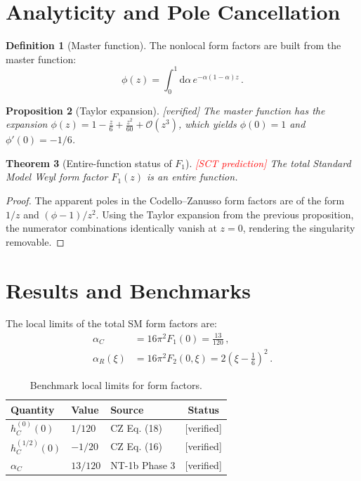 \documentclass[11pt,a4paper]{article}
\newtheorem{theorem}{Theorem}[section]
\newtheorem{proposition}[theorem]{Proposition}
\theoremstyle{definition}
\newtheorem{definition}[theorem]{Definition}
\theoremstyle{remark}
\newcommand{\verified}{\textcolor{green!60!black}{[verified] }}
\newcommand{\sctpred}{\textcolor{red}{[SCT prediction] }}
\begin{document}
\section{Analyticity and Pole Cancellation}

\begin{definition}[Master function]
The nonlocal form factors are built from the master function:
\begin{equation}
    \phi(z) = \int_0^1 \mathrm{d}\alpha\, e^{-\alpha(1-\alpha)z}\,.
\end{equation}
\end{definition}

\begin{proposition}[Taylor expansion]
\verified The master function has the expansion $\phi(z) = 1 - \frac{z}{6} + \frac{z^2}{60} + \mathcal{O}(z^3)$, which yields $\phi(0)=1$ and $\phi'(0)=-1/6$.
\end{proposition}

\begin{theorem}[Entire-function status of $F_1$]
\sctpred The total Standard Model Weyl form factor $F_1(z)$ is an entire function.
\end{theorem}

\begin{proof}
The apparent poles in the Codello--Zanusso form factors are of the form $1/z$ and $(\phi-1)/z^2$. Using the Taylor expansion from the previous proposition, the numerator combinations identically vanish at $z=0$, rendering the singularity removable. 
\end{proof}

\section{Results and Benchmarks}

\begin{tcolorbox}[colback=blue!5!white,colframe=blue!75!black,title=\textbf{Key Result: SM Local Limits}]
The local limits of the total SM form factors are:
\begin{align}
    \alpha_C &= 16\pi^2 F_1(0) = \frac{13}{120}\,, \\
    \alpha_R(\xi) &= 16\pi^2 F_2(0, \xi) = 2\left(\xi - \frac{1}{6}\right)^2\,.
\end{align}
\end{tcolorbox}

\begin{table}[h]
\centering
\begin{tabular}{lllc}
\toprule
\textbf{Quantity} & \textbf{Value} & \textbf{Source} & \textbf{Status} \\
\midrule
$h_C^{(0)}(0)$ & $1/120$ & CZ Eq. (18) & \verified \\
$h_C^{(1/2)}(0)$ & $-1/20$ & CZ Eq. (16) & \verified \\
$\alpha_C$ & $13/120$ & NT-1b Phase 3 & \verified \\
\bottomrule
\end{tabular}
\caption{Benchmark local limits for form factors.}
\end{table}
\end{document}

